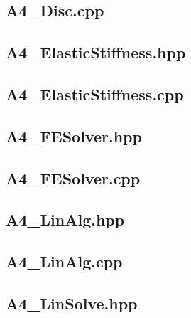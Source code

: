 \documentclass[a4paper, 12pt]{article}
\begin{document}
\subsection{A4\_Disc.cpp} \label{subsec:Disc.cpp}


\subsection{A4\_ElasticStiffness.hpp} \label{subsec:ElasticStiffness.hpp}


\subsection{A4\_ElasticStiffness.cpp} \label{subsec:ElasticStiffness.cpp}


\subsection{A4\_FESolver.hpp} \label{subsec:FESolver.hpp}


\subsection{A4\_FESolver.cpp} \label{subsec:FESolver.cpp}


\subsection{A4\_LinAlg.hpp} \label{subsec:LinAlg.hpp}


\subsection{A4\_LinAlg.cpp} \label{subsec:LinAlg.cpp}


\subsection{A4\_LinSolve.hpp} \label{subsec:LinSolve.hpp}

\end{document}
